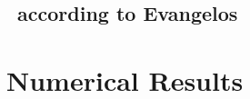 \section{\KSe\ according to Evangelos}


\chapter{Numerical Results}


\begin{postliminary}
\gtindex
    \ifpaper               %
\begin{vita}
    
\end{vita}
    \fi
\end{postliminary}


